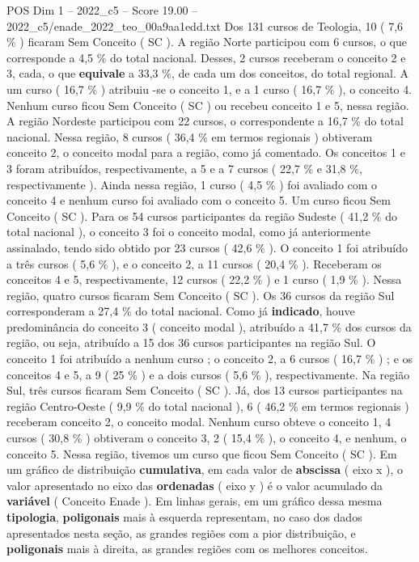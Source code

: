 \begin{textsample}{POS Dim 1 – 2022\_c5 – Score 19.00 – 2022\_c5/enade\_2022\_teo\_00a9aa1edd.txt}
Dos 131 cursos de Teologia, 10 ( 7,6 \% ) ficaram Sem Conceito ( SC ).
A região Norte participou com 6 cursos, o que corresponde a 4,5 \% do total nacional.
Desses, 2 cursos receberam o conceito 2 e 3, cada, o que \textbf{equivale} a 33,3 \%, de cada um dos conceitos, do total regional.
A um curso ( 16,7 \% ) atribuiu -se o conceito 1, e a 1 curso ( 16,7 \% ), o conceito 4.
Nenhum curso ficou Sem Conceito ( SC ) ou recebeu conceito 1 e 5, nessa região.
A região Nordeste participou com 22 cursos, o correspondente a 16,7 \% do total nacional.
Nessa região, 8 cursos ( 36,4 \% em termos regionais ) obtiveram conceito 2, o conceito modal para a região, como já comentado.
Os conceitos 1 e 3 foram atribuídos, respectivamente, a 5 e a 7 cursos ( 22,7 \% e 31,8 \%, respectivamente ).
Ainda nessa região, 1 curso ( 4,5 \% ) foi avaliado com o conceito 4 e nenhum curso foi avaliado com o conceito 5.
Um curso ficou Sem Conceito ( SC ).
Para os 54 cursos participantes da região Sudeste ( 41,2 \% do total nacional ), o conceito 3 foi o conceito modal, como já anteriormente assinalado, tendo sido obtido por 23 cursos ( 42,6 \% ).
O conceito 1 foi atribuído a três cursos ( 5,6 \% ), e o conceito 2, a 11 cursos ( 20,4 \% ).
Receberam os conceitos 4 e 5, respectivamente, 12 cursos ( 22,2 \% ) e 1 curso ( 1,9 \% ).
Nessa região, quatro cursos ficaram Sem Conceito ( SC ).
Os 36 cursos da região Sul corresponderam a 27,4 \% do total nacional.
Como já \textbf{indicado}, houve predominância do conceito 3 ( conceito modal ), atribuído a 41,7 \% dos cursos da região, ou seja, atribuído a 15 dos 36 cursos participantes na região Sul.
O conceito 1 foi atribuído a nenhum curso ; o conceito 2, a 6 cursos ( 16,7 \% ) ; e os conceitos 4 e 5, a 9 ( 25 \% ) e a dois cursos ( 5,6 \% ), respectivamente.
Na região Sul, três cursos ficaram Sem Conceito ( SC ).
Já, dos 13 cursos participantes na região Centro-Oeste ( 9,9 \% do total nacional ), 6 ( 46,2 \% em termos regionais ) receberam conceito 2, o conceito modal.
Nenhum curso obteve o conceito 1, 4 cursos ( 30,8 \% ) obtiveram o conceito 3, 2 ( 15,4 \% ), o conceito 4, e nenhum, o conceito 5.
Nessa região, tivemos um curso que ficou Sem Conceito ( SC ).
Em um gráfico de distribuição \textbf{cumulativa}, em cada valor de \textbf{abscissa} ( eixo x ), o valor apresentado no eixo das \textbf{ordenadas} ( eixo y ) é o valor acumulado da \textbf{variável} ( Conceito Enade ).
Em linhas gerais, em um gráfico dessa mesma \textbf{tipologia}, \textbf{poligonais} mais à esquerda representam, no caso dos dados apresentados nesta seção, as grandes regiões com a pior distribuição, e \textbf{poligonais} mais à direita, as grandes regiões com os melhores conceitos.

\end{textsample}
